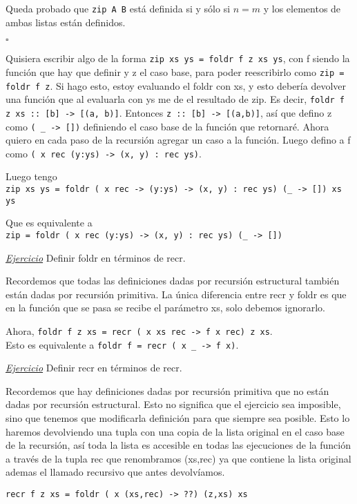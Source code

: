 \documentclass[12pt]{extarticle}
\def\ejercicio{\textit{\underline{Ejercicio} }}
\newcommand\hsline[1]{\texttt{#1}}
\begin{document}
Queda probado que \hsline{zip A B} está definida si y sólo si $n = m$ y los elementos de ambas listas están definidos.
\begin{flushright}
$\square$
\end{flushright}

Quisiera escribir algo de la forma \hsline{zip xs ys = foldr f z xs ys}, con f siendo la función que hay que definir y z el caso base, para poder reescribirlo como \hsline{zip = foldr f z}. Si hago esto, estoy evaluando el foldr con xs, y esto debería devolver una función que al evaluarla con ys me de el resultado de zip. Es decir, \hsline{foldr f z xs :: [b] -> [(a, b)]}. Entonces \hsline{z :: [b] -> [(a,b)]}, así que defino z como \hsline{(\ _ -> [])} definiendo el caso base de la función que retornaré. Ahora quiero en cada paso de la recursión agregar un caso a la función. Luego defino a f como \hsline{(\ x rec (y:ys) -> (x, y) : rec ys)}.

Luego tengo \\
\hsline{zip xs ys = foldr (\ x rec -> (y:ys) -> (x, y) : rec ys) (_ -> []) xs ys}

Que es equivalente a \\
\hsline{zip = foldr (\ x rec (y:ys) -> (x, y) : rec ys) (_ -> [])}

\ejercicio Definir foldr en términos de recr.

Recordemos que todas las definiciones dadas por recursión estructural también están dadas por recursión primitiva. La única diferencia entre recr y foldr es que en la función que se pasa se recibe el parámetro xs, solo debemos ignorarlo.

Ahora, \hsline{foldr f z xs = recr (\ x xs rec -> f x rec) z xs}. \\
Esto es equivalente a \hsline{foldr f = recr (\ x _ -> f x)}.

\ejercicio Definir recr en términos de recr.

Recordemos que hay definiciones dadas por recursión primitiva que no están dadas por recursión estructural. Esto no significa que el ejercicio sea imposible, sino que tenemos que modificarla definición para que siempre sea posible. Esto lo haremos devolviendo una tupla con una copia de la lista original en el caso base de la recursión, así toda la lista es accesible en todas las ejecuciones de la función a través de la tupla rec que renombramos (xs,rec) ya que contiene la lista original ademas el llamado recursivo que antes devolvíamos.

\hsline{recr f z xs = foldr (\ x (xs,rec) -> ??) (z,xs) xs}
\end{document}
